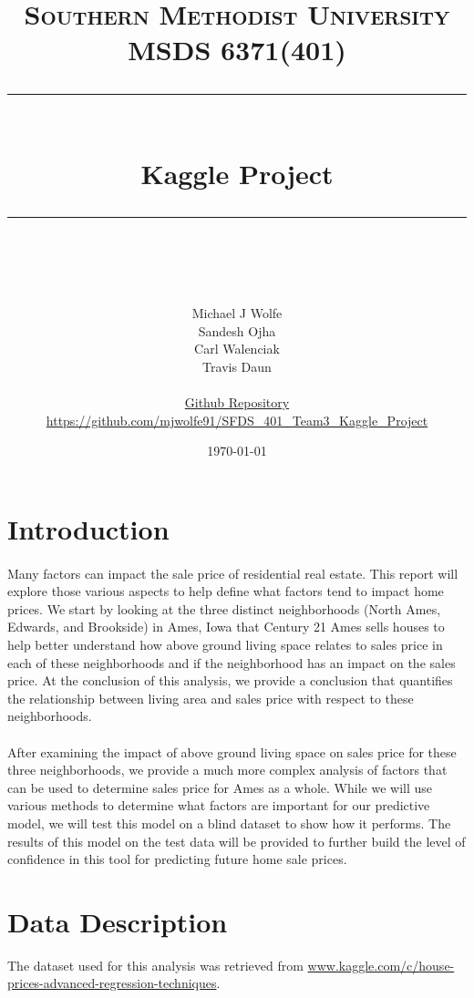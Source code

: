 \documentclass[11pt]{scrartcl} %
\title{	
	\normalfont\normalsize
	\textsc{Southern Methodist University\\
	 MSDS 6371(401)}\\ %
	\vspace{25pt} %
	\rule{\linewidth}{0.5pt}\\ %
	\vspace{20pt} %
	{\huge Kaggle Project}\\ %
	\vspace{12pt} %
	\rule{\linewidth}{2pt}\\ %
	\vspace{12pt} %
}
\author{\LARGE Michael J Wolfe\\
			\LARGE Sandesh Ojha\\
			\LARGE Carl Walenciak\\
			\LARGE Travis Daun\\
			\\
			\small \href{https://github.com/mjwolfe91/SFDS_401_Team3_Kaggle_Project}{Github Repository}\\
			\small \href{https://github.com/mjwolfe91/SFDS_401_Team3_Kaggle_Project}{https://github.com/mjwolfe91/SFDS\_401\_Team3\_Kaggle\_Project}\\} %
\date{\normalsize\today} %
\begin{document}
\maketitle %


\pagebreak


\tableofcontents{}
\pagebreak


\section{Introduction}
\paragraph{} Many factors can impact the sale price of residential real estate. This report will explore those various aspects to help define what factors tend to impact home prices. We start by looking at the three distinct neighborhoods (North Ames, Edwards, and Brookside) in Ames, Iowa that Century 21 Ames sells houses to help better understand how above ground living space relates to sales price in each of these neighborhoods and if the neighborhood has an impact on the sales price. At the conclusion of this analysis, we provide a conclusion that quantifies the relationship between living area and sales price with respect to these neighborhoods.
\paragraph{} After examining the impact of above ground living space on sales price for these three neighborhoods, we provide a much more complex analysis of factors that can be used to determine sales price for Ames as a whole. While we will use various methods to determine what factors are important for our predictive model, we will test this model on a blind dataset to show how it performs. The results of this model on the test data will be provided to further build the level of confidence in this tool for predicting future home sale prices.

\section{Data Description}
The dataset used for this analysis was retrieved from \href{https://www.kaggle.com/c/house-prices-advanced-regression-techniques}{www.kaggle.com/c/house-prices-advanced-regression-techniques}.
\end{document}
